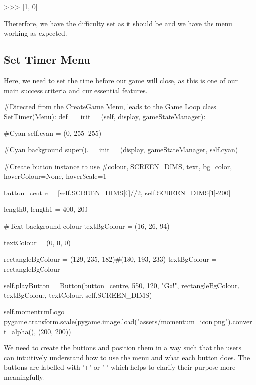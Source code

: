 \begin{mpy}
>>>
[1, 0]
\end{mpy}

Thererfore, we have the difficulty set as it should be and we have the menu working as expected.

\subsection{Set Timer Menu}

Here, we need to set the time before our game will close, as this is one of our main success criteria and our essential features.

\begin{mpy}
#Directed from the CreateGame Menu, leads to the Game Loop
class SetTimer(Menu):
    def __init__(self, display, gameStateManager):

        #Cyan
        self.cyan = (0, 255, 255)

        #Cyan background
        super().__init__(display, gameStateManager, self.cyan)

        #Create button instance to use
        #colour, SCREEN_DIMS, text, bg_color, hoverColour=None, hoverScale=1

        button_centre = [self.SCREEN_DIMS[0]//2, self.SCREEN_DIMS[1]-200]

        length0, length1 = 400, 200

        #Text background colour
        textBgColour = (16, 26, 94)

        textColour = (0, 0, 0)

        rectangleBgColour = (129, 235, 182)#(180, 193, 233)
        textBgColour = rectangleBgColour

        self.playButton = Button(button_centre, 550, 120, "Go!", rectangleBgColour, textBgColour, textColour, self.SCREEN_DIMS)

        self.momentumLogo = pygame.transform.scale(pygame.image.load("assets/momentum_icon.png").convert_alpha(), (200, 200))
\end{mpy}

We need to create the buttons and position them in a way such that the users can intuitively understand how to use the menu and what each button does. The buttons are labelled with '+' or '-' which helps to clarify their purpose more meaningfully.

